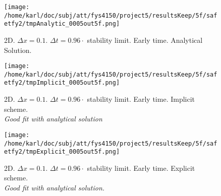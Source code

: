 \documentclass{article}
\begin{document}
\begin{minipage}{.30\textwidth}
	\begin{figure}[H]
		\centering
		\texttt{[image: /home/karl/doc/subj/att/fys4150/project5/resultsKeep/5f/safetfy2/tmpAnalytic\_0005out5f.png]}
		\caption{2D. $\Delta x = 0.1$. $\Delta t = 0.96 \cdot$ stability limit. Early time. Analytical Solution.\\ \textit{}}
		\label{fig:fig2d1}
	\end{figure}
\end{minipage}\hfill
\begin{minipage}{.30\textwidth} 
	\begin{figure}[H]
		\centering
		\texttt{[image: /home/karl/doc/subj/att/fys4150/project5/resultsKeep/5f/safetfy2/tmpImplicit\_0005out5f.png]}
		\caption{2D. $\Delta x = 0.1$. $\Delta t = 0.96 \cdot$ stability limit. Early time. Implicit scheme.\\ \textit{Good fit with analytical solution}}
		\label{fig:fig2d2}
	\end{figure}
\end{minipage}\hfill
\begin{minipage}{.30\textwidth} 
	\begin{figure}[H]
		\centering
		\texttt{[image: /home/karl/doc/subj/att/fys4150/project5/resultsKeep/5f/safetfy2/tmpExplicit\_0005out5f.png]}
		\caption{2D. $\Delta x = 0.1$. $\Delta t = 0.96 \cdot$ stability limit. Early time. Explicit scheme.\\ \textit{Good fit with analytical solution.}}
		\label{fig:fig2d3}
	\end{figure}
\end{minipage}\hfill
\vspace{2ex}
\end{document}
